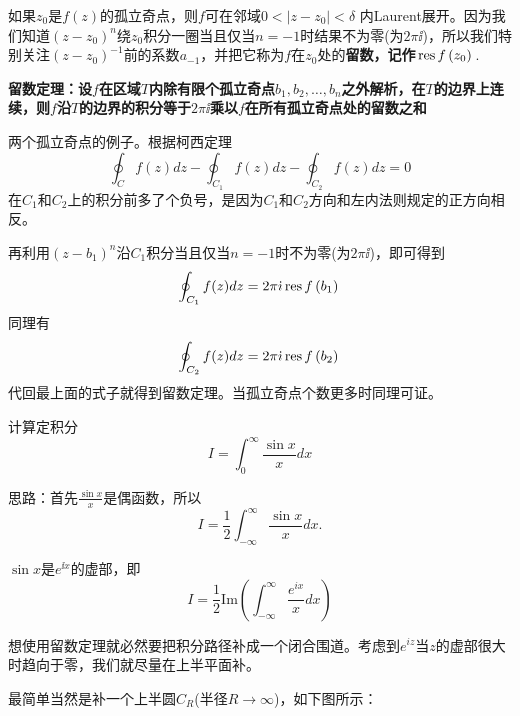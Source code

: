 \documentclass[CJK]{beamer}
\begin{document}
\begin{frame}
  \bch
  如果$z_0$是$f(z)$的孤立奇点，则$f$可在邻域$0<|z-z_0|<\delta$ 内Laurent展开。因为我们知道$(z-z_0)^n$绕$z_0$积分一圈当且仅当$n= -1$时结果不为零(为$2 \pi\ii$)，所以我们特别关注$(z-z_0)^{-1}$前的系数$a_{-1}$，并把它称为$f$在$z_0$处的{\bf 留数，记作$\,\mathrm{res}\,f\left(z_0\right)\,$}.
  \ech
\end{frame}


\begin{frame}
  \bch
      {\blue \bf 留数定理：设$f$在区域$T$内除有限个孤立奇点$b_1,b_2,\ldots,b_n$之外解析，在$T$的边界上连续，则$f$沿$T$的边界的积分等于$2\pi\ii$乘以$f$在所有孤立奇点处的留数之和}


  \ech
\end{frame}

\begin{frame}
  \bch
  两个孤立奇点的例子。根据柯西定理
  $$\oint_C f(z) dz - \oint_{C_1}f(z)dz - \oint_{C_2}f(z) dz = 0$$
  {\scriptsize 在$C_1$和$C_2$上的积分前多了个负号，是因为$C_1$和$C_2$方向和左内法则规定的正方向相反。}  
  \emini
  \emini
  


  再利用$(z-b_1)^n$沿$C_1$积分当且仅当$n=-1$时不为零(为$2\pi\ii$)，即可得到
  $$\oint_{C_1}f(z)dz = 2\pi{\dot{\imath}} \,\mathrm{res}\,f\left(b_1\right)\,$$
  同理有
  $$\oint_{C_2}f(z)dz = 2\pi{\dot{\imath}} \,\mathrm{res}\,f\left(b_2\right)\,$$
  代回最上面的式子就得到留数定理。当孤立奇点个数更多时同理可证。 
  \ech
\end{frame}

\begin{frame}
  \bch
  计算定积分
  $$I = \int_0^\infty \frac{\sin x}{x} dx $$
  \ech
\end{frame}

\begin{frame}
  \bch
  思路：首先$\frac{\sin x}{x}$是偶函数，所以
  $$I = \frac{1}{2} \int_{-\infty}^\infty \frac{\sin x}{x} dx. $$

  $\sin x$是$e^{\ii x}$的虚部，即
  $$I = \frac{1}{2}\mathrm{Im} \left(\int_{-\infty}^\infty \frac{e^{ix}}{x} dx \right)$$
  \ech
\end{frame}

\begin{frame}
  \bch
  想使用留数定理就必然要把积分路径补成一个闭合围道。考虑到$e^{iz}$当$z$的虚部很大时趋向于零，我们就尽量在上半平面补。

  最简单当然是补一个上半圆$C_R$(半径$R\rightarrow \infty$)，如下图所示：
  

  
  
  \ech
\end{frame}
\end{document}
